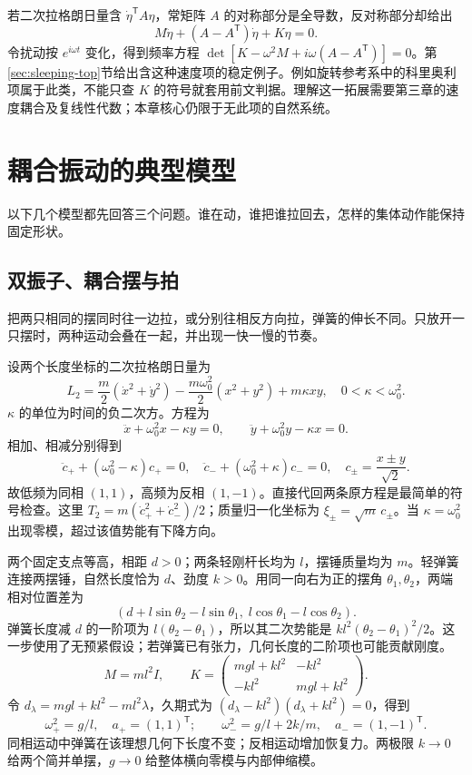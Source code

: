 \begin{modernbox}[title={进一步探索：陀螺项为什么另需处理}]
若二次拉格朗日量含 $\dot\eta^{\mathsf T}A\eta$，常矩阵 $A$ 的对称部分是全导数，反对称部分却给出
\[
M\ddot\eta+(A-A^{\mathsf T})\dot\eta+K\eta=0.
\]
令扰动按 $e^{i\omega t}$ 变化，得到频率方程 $\det[K-\omega^2M+i\omega(A-A^{\mathsf T})]=0$。第\ref{sec:sleeping-top}节给出含这种速度项的稳定例子。例如旋转参考系中的科里奥利项属于此类，不能只查 $K$ 的符号就套用前文判据。理解这一拓展需要第三章的速度耦合及复线性代数；本章核心仍限于无此项的自然系统。
\end{modernbox}


\section{耦合振动的典型模型}
以下几个模型都先回答三个问题。谁在动，谁把谁拉回去，怎样的集体动作能保持固定形状。

\subsection{双振子、耦合摆与拍}
把两只相同的摆同时往一边拉，或分别往相反方向拉，弹簧的伸长不同。只放开一只摆时，两种运动会叠在一起，并出现一快一慢的节奏。

\begin{example}[交叉项的符号决定哪个振型频率低]
设两个长度坐标的二次拉格朗日量为
\[
L_2=\frac m2(\dot x^2+\dot y^2)
-\frac{m\omega_0^2}{2}(x^2+y^2)+m\kappa xy,
\quad 0<\kappa<\omega_0^2.
\]
$\kappa$ 的单位为时间的负二次方。方程为
\[
\ddot x+\omega_0^2x-\kappa y=0,\qquad
\ddot y+\omega_0^2y-\kappa x=0.
\]
相加、相减分别得到
\[
\ddot c_++(\omega_0^2-\kappa)c_+=0,\quad
\ddot c_-+(\omega_0^2+\kappa)c_-=0,\quad
c_\pm=\frac{x\pm y}{\sqrt2}.
\]
故低频为同相 $(1,1)$，高频为反相 $(1,-1)$。直接代回两条原方程是最简单的符号检查。这里 $T_2=m(\dot c_+^2+\dot c_-^2)/2$；质量归一化坐标为 $\xi_\pm=\sqrt m\,c_\pm$。当 $\kappa=\omega_0^2$ 出现零模，超过该值势能有下降方向。
\end{example}

\begin{example}
两个固定支点等高，相距 $d>0$；两条轻刚杆长均为 $l$，摆锤质量均为 $m$。轻弹簧连接两摆锤，自然长度恰为 $d$、劲度 $k>0$。用同一向右为正的摆角 $\theta_1,\theta_2$，两端相对位置差为
\[
(d+l\sin\theta_2-l\sin\theta_1,\;l\cos\theta_1-l\cos\theta_2).
\]
弹簧长度减 $d$ 的一阶项为 $l(\theta_2-\theta_1)$，所以其二次势能是 $kl^2(\theta_2-\theta_1)^2/2$。这一步使用了无预紧假设；若弹簧已有张力，几何长度的二阶项也可能贡献刚度。
\[
M=ml^2I,\qquad
K=\begin{pmatrix}mgl+kl^2&-kl^2\\-kl^2&mgl+kl^2\end{pmatrix}.
\]
令 $d_\lambda=mgl+kl^2-ml^2\lambda$，久期式为 $(d_\lambda-kl^2)(d_\lambda+kl^2)=0$，得到
\begin{equation}
\omega_+^2=g/l,\quad a_+=(1,1)^{\mathsf T};\qquad
\omega_-^2=g/l+2k/m,\quad a_-=(1,-1)^{\mathsf T}.
\label{eq:coupled-pend-freq}
\end{equation}
同相运动中弹簧在该理想几何下长度不变；反相运动增加恢复力。两极限 $k\to0$ 给两个简并单摆，$g\to0$ 给整体横向零模与内部伸缩模。
\end{example}

